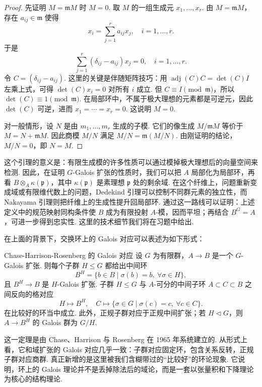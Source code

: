 \begin{proof}
    先证明 $M=\mathfrak{m}M$ 时 $M=0$. 取 $M$ 的一组生成元 $x_1,\ldots,x_r$. 由 $M=\mathfrak{m}M$，存在 $a_{ij}\in\mathfrak{m}$ 使得
    \[
        x_i=\sum_{j=1}^r a_{ij}x_j,\quad i=1,\ldots,r.
    \]
    于是
    \[
        \sum_{j=1}^r(\delta_{ij}-a_{ij})x_j=0,\quad i=1,\ldots,r.
    \]
    令 $C=(\delta_{ij}-a_{ij})$. 这里的关键是伴随矩阵技巧：用 $\operatorname{adj}(C)C=\det(C)I$ 左乘上式，可得 $\det(C)x_i=0$ 对所有 $i$ 成立. 但 $C\equiv I\pmod{\mathfrak{m}}$，所以 $\det(C)\equiv1\pmod{\mathfrak{m}}$. 在局部环中，不属于极大理想的元素都是可逆元，因此 $\det(C)$ 可逆，进而 $x_1=\cdots=x_r=0$. 这说明 $M=0$.

    对一般情形，设 $N$ 是由 $m_1,\ldots,m_r$ 生成的子模. 它们的像生成 $M/\mathfrak{m}M$ 等价于 $M=N+\mathfrak{m}M$. 因此商模 $M/N$ 满足 $M/N=\mathfrak{m}(M/N)$. 由刚证明的结论，$M/N=0$，即 $N=M$.
\end{proof}

这个引理的意义是：有限生成模的许多性质可以通过模掉极大理想后的向量空间来检测. 因此，在证明 $G$-Galois 扩张的性质时，我们可以把 $A$ 局部化为局部环，再看 $B\otimes_A \kappa(\mathfrak{p})$，其中 $\kappa(\mathfrak{p})$ 是素理想 $\mathfrak{p}$ 处的剩余域. 在这个纤维上，问题重新变成域或有限维代数上的问题，Dedekind 引理可以控制不同群元素的独立性，而 Nakayama 引理则把纤维上的生成性提升回局部环. 通过这一路线可以证明：上述定义中的规范映射同构条件使 $B$ 成为有限投射 $A$-模，因而平坦；再结合 $B^G=A$，可进一步得到忠实性. 这里的技术细节我们将在习题中给出.

在上面的背景下，交换环上的 Galois 对应可以表述为如下形式：

\begin{theorem}{Chase-Harrison-Rosenberg 的 Galois 对应}{}
    设 $G$ 为有限群，$A\to B$ 是一个 $G$-Galois 扩张. 则每个子群 $H\leq G$ 都给出中间环
    \[
        B^H=\{b\in B\mid \sigma(b)=b,\ \forall\sigma\in H\},
    \]
    且 $B^H\to B$ 是 $H$-Galois 扩张. 子群 $H\leq G$ 与 $A$-可分的中间子环 $A\subset C\subset B$ 之间反向的格对应
    \[
        H\longmapsto B^H,\quad
        C\longmapsto \{\sigma\in G\mid \sigma(c)=c,\ \forall c\in C\}.
    \]
    在比较好的环当中成立. 此外，正规子群对应于正规中间扩张；若 $H\triangleleft G$，则 $A\to B^H$ 的 Galois 群为 $G/H$.
\end{theorem}

这一定理是由 Chase、Harrison 与 Rosenberg 在 1965 年系统建立的. 从形式上看，它和域扩张的 Galois 对应几乎一致：子群对应固定环，包含关系反转，正规子群对应商群. 真正新增的是这里被我们含糊带过的``比较好''的环论现象. 它说明，环上的 Galois 理论并不是丢掉除法后的域论，而是一套以张量积和下降理论为核心的结构理论.


